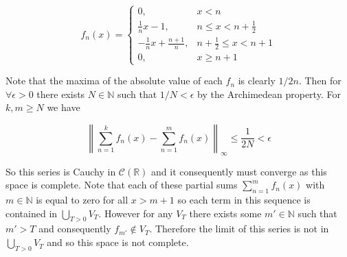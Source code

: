 \documentclass{article}
\begin{document}
\begin{equation*}
	f_n(x) = 
	\begin{cases}
		0, & x < n \\
		\frac{1}{n}x -1, & n \leq x < n + \frac{1}{2} \\
		-\frac{1}{n}x + \frac{n+1}{n}, & n+\frac{1}{2} \leq x < n+1 \\
		0, & x \geq n+1
	\end{cases}
\end{equation*}

Note that the maxima of the absolute value of each $f_n$ is clearly $1/2n$. Then for $\forall \epsilon > 0$ there exists $N \in \mathbb{N}$ such that $1/N <\epsilon$ by 
the Archimedean property. For $k,m \geq N$ we have 

\begin{equation*}
	\left\|\sum_{n =1}^k f_n(x) -  \sum_{n=1}^m f_n(x)\right\|_\infty \leq \frac{1}{2N} < \epsilon
\end{equation*}

So this series is Cauchy in $\mathcal{C}(\mathbb{R})$ and it consequently must converge as this 
space is complete. Note that each of these partial sums $\sum_{n=1}^m f_n(x)$ with $m \in \mathbb{N}$ 
is equal to zero for all $x > m+1$ so each term in this sequence is contained in $\bigcup_{T > 0}V_T$. 
However for any $V_T$ there exists some $m' \in \mathbb{N}$ such that $m' > T$ and consequently 
$f_{m'} \notin V_T$. Therefore the limit of this series is not in $\bigcup_{T > 0}V_T$ and so this 
space is not complete.
\end{document}
